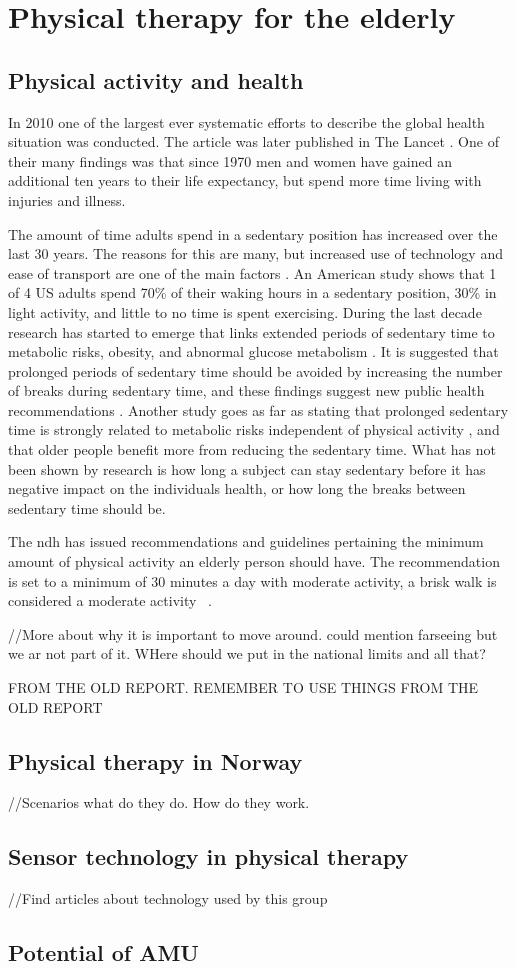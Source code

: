 \chapter{Physical therapy for the elderly}

\section{Physical activity and health}
In 2010 one of the largest ever systematic efforts to describe the global health situation was conducted. The article was later published in The Lancet \cite{globalBurden}. One of their many findings was that since 1970 men and women have gained an additional ten years to their life expectancy, but spend more time living with injuries and illness. 

The amount of time adults spend in a sedentary position has increased over the last 30 years. The reasons for this are many, but increased use of technology and ease of transport are one of the main factors \cite{sedentaryBehaviour}. An American study shows that 1 of 4 US adults spend 70\% of their waking hours in a sedentary position, 30\% in light activity, and little to no time is spent exercising. During the last decade research has started to emerge that links extended periods of sedentary time to metabolic risks\cite{sedentaryTime}, obesity, and abnormal glucose metabolism \cite{breaksSedentary}. It is suggested that prolonged periods of sedentary time should be avoided by increasing the number of breaks during sedentary time, and these findings suggest new public health recommendations \cite{breaksSedentary}. Another study goes as far as stating that prolonged sedentary time is strongly related to metabolic risks independent of physical activity \cite{sedentaryActivity}, and that older people benefit more from reducing the sedentary time. What has not been shown by research is how long a subject can stay sedentary before it has negative impact on the individuals health, or how long the breaks between sedentary time should be.

The \gls{ndh} has issued recommendations and guidelines pertaining the minimum amount of physical activity an elderly person should have. The recommendation is set to a minimum of 30 minutes a day with moderate activity, a brisk walk is considered a moderate activity ~\cite{helsedirektoratetFysiskAktivitet}.

//More about why it is important to move around. could mention farseeing but we ar not part of it. WHere should we put in the national limits and all that?

FROM THE OLD REPORT. REMEMBER TO USE THINGS FROM THE OLD REPORT

\section{Physical therapy in Norway}
//Scenarios what do they do. How do they work.

\section{Sensor technology in physical therapy}
//Find articles about technology used by this group

\section{Potential of AMU}
